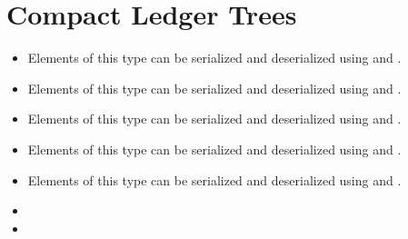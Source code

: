 
\section{Compact Ledger Trees}



\begin{itemize}
\item {}
Elements of this type can be serialized and deserialized using
{}
and {}.
\item {}
Elements of this type can be serialized and deserialized using
{}
and
{}.
\item {}
Elements of this type can be serialized and deserialized using
{}
and
{}.
\item {}
Elements of this type can be serialized and deserialized using
{}
and
{}.
\item {}
Elements of this type can be serialized and deserialized using
{}
and
{}.
\end{itemize}

\begin{itemize}
\item {}
\item {}
\end{itemize}

{}

